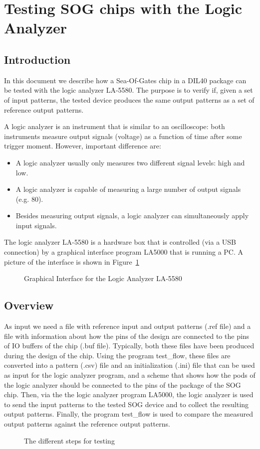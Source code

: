 \def\figurename{Figure}
\section{Testing SOG chips with the Logic Analyzer}
\label{testingSOG}

\subsection{Introduction}
In this document we describe how a Sea-Of-Gates chip in a DIL40 package can be tested 
with the logic analyzer LA-5580. 
The purpose is to verify if, given a set of input patterns, 
the tested device produces the same output patterns as a set of reference output patterns. 

A logic analyzer is an instrument that is similar to an oscilloscope:
both instruments measure output signals (voltage) as a function of time
after some trigger moment.
However, important difference are:
\begin{itemize}
\item
A logic analyzer usually only measures two different signal levels: high and low.
\item
A logic analyzer is capable of measuring a large number of output signals (e.g. 80).
\item
Besides measuring output signals, a logic analyzer can simultaneously apply input signals.
\end{itemize}
The logic analyzer LA-5580 is a hardware box that is controlled 
(via a USB connection) by a graphical interface program LA5000 that is running a PC.
A picture of the interface is shown in Figure~\ref{la5000}
\begin{figure}[h]
\centerline{}
\caption{Graphical Interface for the Logic Analyzer LA-5580}
\label{la5000}
\end{figure}
\subsection{Overview}
As input we need a file with reference input and output patterns (.ref file) and a file with 
information about how the pins of the design are connected to the pins of IO buffers of 
the chip (.buf file).  Typically, both these files have been produced during the design of 
the chip. Using the program test\_flow, these files are converted into a pattern (.csv)
file and an initialization (.ini) file that can be used as input for the logic analyzer 
program,
and a scheme that shows how the pods of the logic analyzer should be connected to 
the pins of the package of the SOG chip. 
Then,
via the the logic analyzer program LA5000,
the logic analyzer is used to send the input patterns to the tested SOG device 
and to collect the resulting output patterns. 
Finally, the 
program test\_flow is used to compare the measured output patterns against the reference 
output patterns.
\begin{figure}[h]
\centerline{}
\caption{The different steps for testing}
\label{testflow}
\end{figure}

